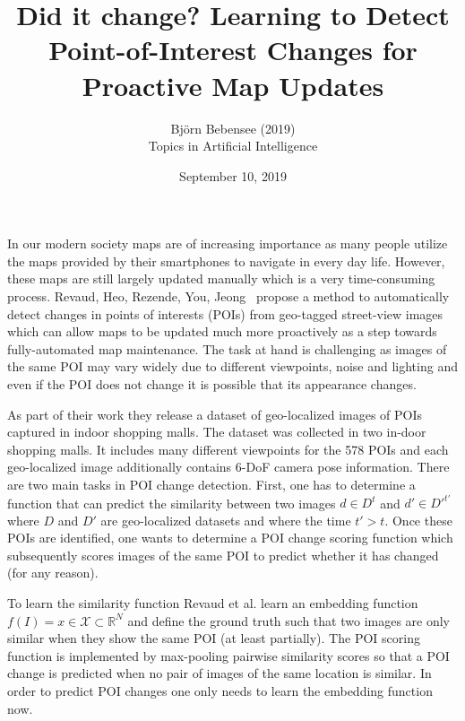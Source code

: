 \documentclass[12pt]{article}
\begin{document}
 
 
\title{Did it change? Learning to Detect Point-of-Interest Changes for Proactive Map Updates}
\author{Bj\"orn Bebensee (2019)\\ %
Topics in Artificial Intelligence}
\date{September 10, 2019}
\maketitle

In our modern society maps are of increasing importance as many people utilize the maps provided by their smartphones to navigate in every day life. However, these maps are still largely updated manually which is a very time-consuming process. Revaud, Heo, Rezende, You, Jeong~\cite{change} propose a method to automatically detect changes in points of interests (POIs) from geo-tagged street-view images which can allow maps to be updated much more proactively as a step towards fully-automated map maintenance. The task at hand is challenging as images of the same POI may vary widely due to different viewpoints, noise and lighting and even if the POI does not change it is possible that its appearance changes.

As part of their work they release a dataset of geo-localized images of POIs captured in indoor shopping malls. The dataset was collected in two in-door shopping malls. It includes many different viewpoints for the 578 POIs and each geo-localized image additionally contains 6-DoF camera pose information. There are two main tasks in POI change detection. First, one has to determine a function that can predict the similarity between two images $d \in D^t$ and $d' \in D'^{t'}$ where $D$ and $D'$ are geo-localized datasets and where the time $t' > t$. Once these POIs are identified, one wants to determine a POI change scoring function which subsequently scores images of the same POI to predict whether it has changed (for any reason).

To learn the similarity function Revaud et al. learn an embedding function $f(I) = x \in \mathcal{X} \subset \mathbb{R}^N$ and define the ground truth such that two images are only similar when they show the same POI (at least partially). The POI scoring function is implemented by max-pooling pairwise similarity scores so that a POI change is predicted when no pair of images of the same location is similar. In order to predict POI changes one only needs to learn the embedding function now.
\end{document}
